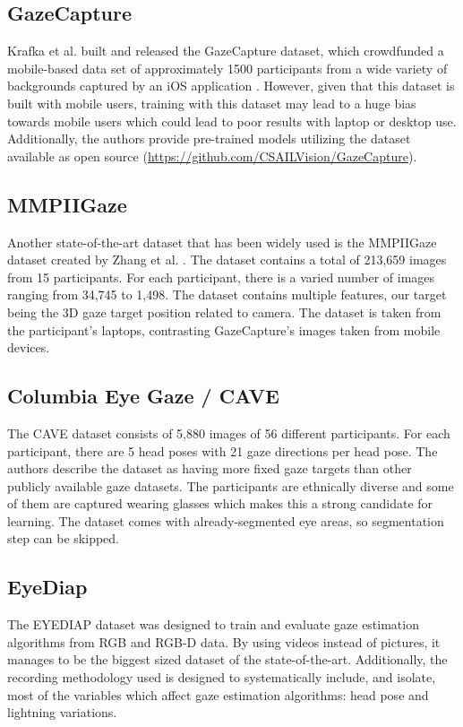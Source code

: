 \subsection{GazeCapture}
Krafka et al. built and released the GazeCapture dataset, which crowdfunded a mobile-based data set of approximately 1500 participants from a wide variety of backgrounds captured by an iOS application \cite{GazeCapture}. However, given that this dataset is built with mobile users, training with this dataset may lead to a huge bias towards mobile users which could lead to poor results with laptop or desktop use.
Additionally, the authors provide pre-trained models utilizing the dataset available as open source (\url{https://github.com/CSAILVision/GazeCapture}).

\subsection{MMPIIGaze}
Another state-of-the-art dataset that has been widely used is the MMPIIGaze dataset created by Zhang et al. \cite{GazeEstimationInTheWild}.
The dataset contains a total of 213,659 images from 15 participants. For each participant, there is a varied number of
images ranging from 34,745 to 1,498. The dataset contains multiple features, our target being the 3D gaze target position related to camera.
The dataset is taken from the participant's laptops, contrasting GazeCapture's images taken from mobile devices.

\subsection{Columbia Eye Gaze / CAVE}
The CAVE dataset \cite{CAVE_0324} consists of 5,880 images of 56 different participants. For each participant, there are 5 head poses with 21 gaze directions per head pose. The authors describe the dataset as having more fixed gaze targets than other publicly available gaze datasets. The participants are ethnically diverse and some of them are captured wearing glasses which makes this a strong candidate for learning. The dataset comes with already-segmented eye areas, so segmentation step can be skipped.

\subsection{EyeDiap}
The EYEDIAP dataset was designed to train and evaluate gaze estimation algorithms from RGB and RGB-D data. By using videos instead of pictures,
it manages to be the biggest sized dataset of the state-of-the-art. Additionally, the recording methodology used is designed to systematically include, and isolate,
most of the variables which affect gaze estimation algorithms: head pose and lightning variations.

